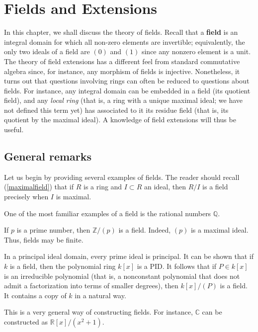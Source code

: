 \chapter{Fields and Extensions}

In this chapter, we shall discuss the theory of fields.
Recall that a \textbf{field} is an integral domain for which all non-zero elements are
invertible; equivalently, the only two ideals of a field are $(0)$ and $(1)$
since any nonzero element is a unit. 
The theory of field extensions has a different feel from standard commutative
algebra since, for instance, any morphism of fields is injective. Nonetheless,
it turns out that questions involving rings can often be reduced to questions
about fields. For instance, any integral domain can be embedded in a field
(its quotient field), and any \emph{local ring} (that is, a ring with a unique
maximal ideal; we have not defined this term yet) has associated to it its
residue field (that is, its quotient by the maximal ideal).
A knowledge of field extensions will thus be useful.


\section{General remarks}
Let us begin by providing several examples of fields. The reader should
recall (\cref{maximalfield}) that if $R$ is a ring and $I \subset R$ an
ideal, then $R/I$ is a field precisely when $I$ is maximal.

\begin{example}
One of the most familiar examples of a field is the rational
numbers $\mathbb{Q}$.
\end{example}

\begin{example}
If $p$ is a prime number, then $\mathbb{Z}/(p)$ is a field. Indeed, $(p)$ is a
maximal ideal. Thus, fields may be finite. 
\end{example}


\begin{example} 
In a principal ideal domain, every prime ideal is principal. It can be shown
that if $k$ is a field, then the polynomial ring $k[x]$ is a PID. 
It follows that if $P \in k[x]$ is an irreducible polynomial (that is, a
nonconstant polynomial
that does not admit a factorization into terms of smaller degrees), then
$k[x]/(P)$ is a field. It contains a copy of $k$ in a natural way.

This is a very general way of constructing fields. For instance, $\mathbb{C}$
can be constructed as $\mathbb{R}[x]/(x^2 + 1)$.
\end{example} 

